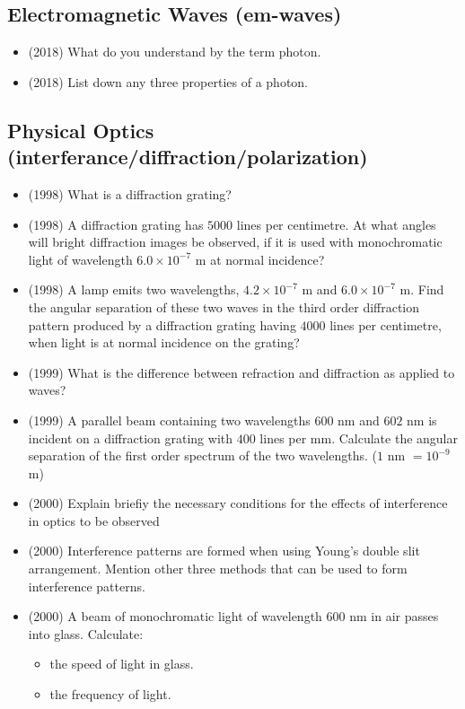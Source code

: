 \documentclass{article}
\begin{document}
\subsection{Electromagnetic Waves (em-waves)}
\begin{itemize}
\item (2018)  What do you understand by the term photon. 
\item (2018)  List down any three properties of a photon. 
\end{itemize}

\subsection{Physical Optics (interferance/diffraction/polarization)}
\begin{itemize}
\item (1998)  What is a diffraction grating?
\item (1998)  A diffraction grating has $ 5000$ lines per centimetre. At what angles will bright diffraction images be observed, if it is used with monochromatic light of wavelength $ 6.0 \times 10^{-7}$ m at normal incidence?
\item (1998)  A lamp emits two wavelengths, $ 4.2 \times 10^{-7}$ m and $ 6.0 \times 10^{-7}$ m. Find the angular separation of these two waves in the third order diffraction pattern produced by a diffraction grating having $ 4000$ lines per centimetre, when light is at normal incidence on the grating?
\item (1999)  What is the difference between refraction and diffraction as applied to waves?
\item (1999)  A parallel beam containing two wavelengths $ 600$ nm and $ 602$ nm is incident on a diffraction grating with $ 400$ lines per mm. Calculate the angular separation of the first order spectrum of the two wavelengths. ($ 1$ nm $ =10^{-9}$ m)
\item (2000)  Explain briefiy the necessary conditions for the effects of interference in optics to be observed
\item (2000)  Interference patterns are formed when using Young’s double slit arrangement. Mention other three methods that can be used to form interference patterns.
\item (2000)  A beam of monochromatic light of wavelength $ 600$ nm in air passes into glass. Calculate:\begin{itemize}
\item the speed of light in glass.
\item the frequency of light.

\end{itemize}
\end{itemize}
\end{document}
